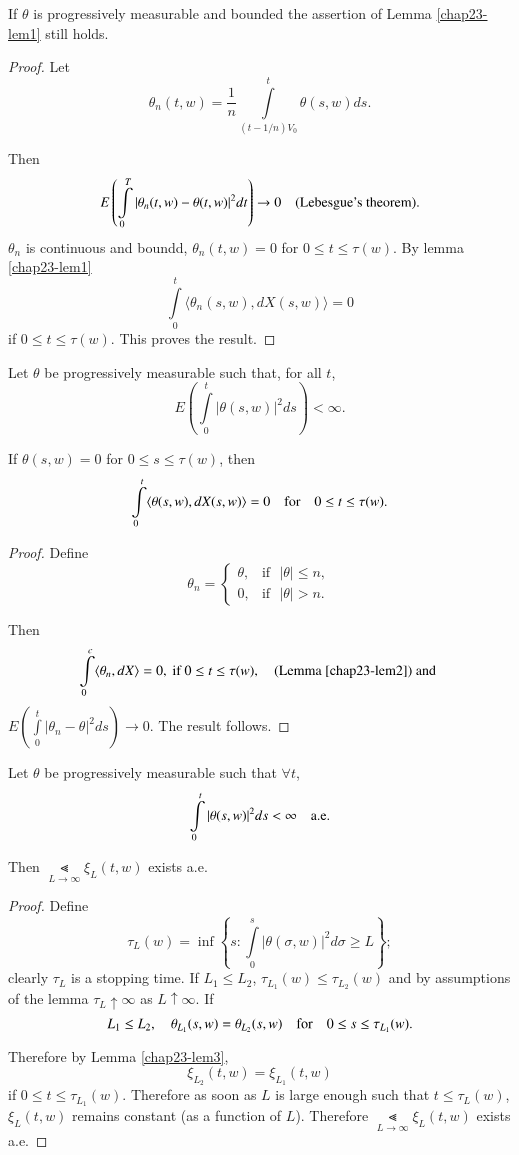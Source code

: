 \begin{lemma}\label{chap23-lem2}%
If $\theta$ is progressively measurable and bounded the assertion of
Lemma \ref{chap23-lem1} still holds.
\end{lemma}

\begin{proof}
Let
$$
\theta_{n}(t,w)=\frac{1}{n}\int\limits^{t}_{(t-1/n)V_{0}}\theta(s,w)ds.
$$

Then
$$
E\left(\int\limits^{T}_{0}|\theta_{n}(t,w)-\theta(t,w)|^{2}dt\right)\to
0\quad\text{(Lebesgue's theorem).}
$$
$\theta_{n}$ is continuous and boundd, $\theta_{n}(t,w)=0$ for $0\leq
t\leq \tau(w)$. By lemma \ref{chap23-lem1}\pageoriginale
$$
\int\limits^{t}_{0}\langle \theta_{n}(s,w),dX(s,w)\rangle=0
$$
if $0\leq t\leq \tau(w)$. This proves the result.
\end{proof}

\begin{lemma}\label{chap23-lem3}
Let $\theta$ be progressively measurable such that, for all $t$, 
$$
E\left(\int\limits^{t}_{0}|\theta(s,w)|^{2}ds\right)<\infty.
$$

If $\theta(s,w)=0$ for $0\leq s\leq \tau(w)$, then
$$
\int\limits^{t}_{0}\langle \theta(s,w),dX(s,w)\rangle =0\quad\text{for}\quad
0\leq t\leq \tau(w).
$$
\end{lemma}

\begin{proof}
Define
$$
\theta_{n}=
\begin{cases}
\theta, & \text{if~ }|\theta|\leq n,\\
0, & \text{if~ } |\theta|>n.
\end{cases}
$$

Then
$$
\int\limits^{c}_{0}\langle \theta_{n},dX\rangle =0, \text{~ if~ }0\leq
t\leq \tau(w), \quad\text{(Lemma \ref{chap23-lem2}) and }
$$
$E(\int\limits^{t}_{0}|\theta_{n}-\theta|^{2}ds)\to 0$. The result follows.
\end{proof}

\begin{lemma}\label{chap23-lem4}
Let $\theta$ be progressively measurable such that $\forall t$,
$$
\int\limits^{t}_{0}|\theta(s,w)|^{2}ds<\infty\quad\text{a.e.}
$$

Then $\Lt\limits_{L\to \infty}\xi_{L}(t,w)$ exists a.e.
\end{lemma}

\begin{proof}
Define\pageoriginale
$$
\tau_{L}(w)=\inf
\left\{s:\int\limits^{s}_{0}|\theta(\sigma,w)|^{2}d\sigma\geq
L\right\};
$$
clearly $\tau_{L}$ is a stopping time. If $L_{1}\leq L_{2}$,
$\tau_{L_{1}}(w)\leq \tau_{L_{2}}(w)$ and by assumptions of the lemma
$\tau_{L}\uparrow \infty$ as $L\uparrow \infty$. If
$$
L_{1}\leq L_{2},\quad
\theta_{L_{1}}(s,w)=\theta_{L_{2}}(s,w)\quad\text{for}\quad 0\leq s\leq
\tau_{L_{1}}(w). 
$$

Therefore by Lemma \ref{chap23-lem3},
$$
\xi_{L_{2}}(t,w)=\xi_{L_{1}}(t,w)
$$
if $0\leq t\leq \tau_{L_{1}}(w)$. Therefore as soon as $L$ is large
enough such that $t\leq \tau_{L}(w)$, $\xi_{L}(t,w)$ remains constant
(as a function of $L$). Therefore $\Lt\limits_{L\to
  \infty}\xi_{L}(t,w)$ exists a.e.
\end{proof}

